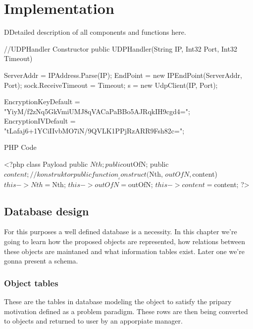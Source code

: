 \chapter{Implementation}
DDetailed description of all components and  functions here.  
\begin{csharpcode}
//UDPHandler Constructor 
public UDPHandler(String IP, Int32 Port, Int32 Timeout)
{
    ServerAddr = IPAddress.Parse(IP);
    EndPoint = new IPEndPoint(ServerAddr, Port);
    sock.ReceiveTimeout = Timeout;
    s = new UdpClient(IP, Port);
    
    EncryptionKeyDefault = "YiyM/f2zNq5GkVmiUMJ8qVACaPaBBo5AJRqkIH9cgd4=";
    EncryptionIVDefault = "tLafaj6+1YCiIIvbMO7iN/9QVLK1PPjRzARR9Fsh82c=";
}
\end{csharpcode}
PHP Code
\begin{phpcode}
<?php
class Payload
{
    public $Nth;
    public $outOfN;
    public $content;
    //konstruktor
    public function __construct($Nth, $outOfN, $content)
    {
        $this->Nth = $Nth;
        $this->outOfN = $outOfN;
        $this->content = $content;
    }
}
?>
\end{phpcode}

\section{Database design}
For this purposes a well defined database is a necessity. In this chapter we're going to learn how the proposed objects are represented, how relations between these objects are maintaned and what information tables exist. Later one we're gonna present a schema.
\subsection{Object tables}
These are the tables in database modeling the object to satisfy the pripary motivation defined as a problem paradigm. These rows are then being converted to objects and returned to user by an apporpiate manager.

